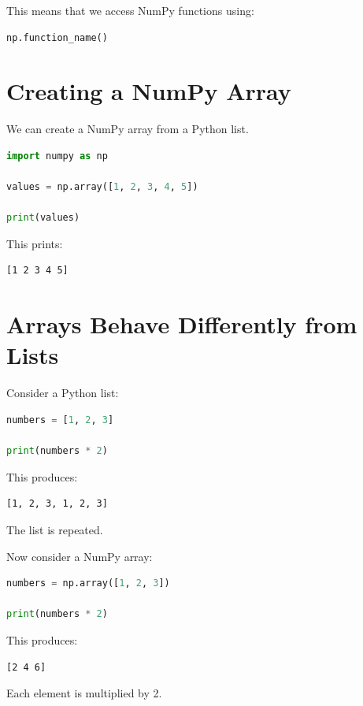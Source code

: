 \documentclass[11pt]{article}
\begin{document}
This means that we access NumPy functions using:

\begin{lstlisting}[language=Python]
np.function_name()
\end{lstlisting}

\section{Creating a NumPy Array}

We can create a NumPy array from a Python list.

\begin{lstlisting}[language=Python]
import numpy as np

values = np.array([1, 2, 3, 4, 5])

print(values)
\end{lstlisting}

This prints:

\begin{verbatim}
[1 2 3 4 5]
\end{verbatim}

\section{Arrays Behave Differently from Lists}

Consider a Python list:

\begin{lstlisting}[language=Python]
numbers = [1, 2, 3]

print(numbers * 2)
\end{lstlisting}

This produces:

\begin{verbatim}
[1, 2, 3, 1, 2, 3]
\end{verbatim}

The list is repeated.

Now consider a NumPy array:

\begin{lstlisting}[language=Python]
numbers = np.array([1, 2, 3])

print(numbers * 2)
\end{lstlisting}

This produces:

\begin{verbatim}
[2 4 6]
\end{verbatim}

Each element is multiplied by 2.
\end{document}
